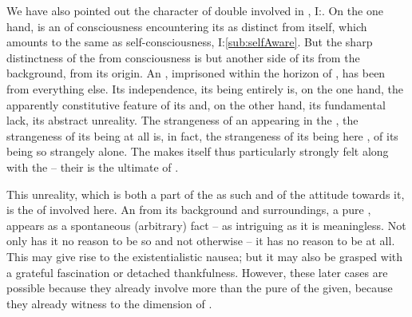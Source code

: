 \pa\label{pa:madSpontaneity}
We have also pointed out the character of double  involved in
, I:. On the one hand,  is an
 of consciousness encountering its  as distinct from
itself, which amounts to the same as self-consciousness, I:\ref{sub:selfAware}.
But the sharp distinctness of the  from consciousness is but another
side of its  from the background, from its 
origin.  An , imprisoned within the horizon of , has
been  from everything else. Its independence, its being entirely
 is, on the one hand, the apparently constitutive feature of its
 and, on the other hand, its fundamental lack, its abstract
unreality.  The strangeness of an  appearing in the , the strangeness of its being at all is, in fact, the strangeness
of its being here , of its being so strangely alone.  The
 makes itself thus particularly strongly felt along
with the  -- their  is the ultimate
 of .

This unreality, which is both a part of the  as such
and of the  attitude towards it, is the  of
 involved here.  An  from its
background and surroundings, a pure , appears as a spontaneous
(arbitrary) fact  -- as intriguing as it is meaningless.  Not
only has it no reason to be so and not otherwise -- it has no reason to be at
all.   This may give rise to the
existentialistic {nausea}; but it may also be grasped with a grateful
fascination or detached thankfulness.  However, these later cases are possible
because they already involve more than the pure  of the given,
because they already witness to the  dimension of
.


